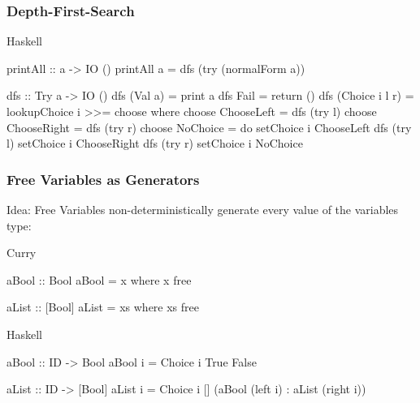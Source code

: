 \documentclass[utf8]{beamer}
\newenvironment{program}{\begin{semiverbatim}\small}{\end{semiverbatim}}
\begin{document}
\begin{frame}[fragile]
\frametitle{Depth-First-Search}

\begin{block}{Haskell}
\begin{program}
printAll :: a -> IO ()
printAll a = dfs (try (normalForm a))

dfs :: Try a -> IO ()
dfs (Val a)        = print a
dfs Fail           = return ()
dfs (Choice i l r) = lookupChoice i >>= choose
 where choose ChooseLeft  = dfs (try l)
       choose ChooseRight = dfs (try r)
       choose NoChoice    = do setChoice i ChooseLeft
                               dfs (try l)
                               setChoice i ChooseRight
                               dfs (try r)
                               setChoice i NoChoice
\end{program}
\end{block}


\end{frame}

\begin{frame}[fragile]
\frametitle{Free Variables as Generators}

Idea: Free Variables non-deterministically generate every value
of the variables type:

\begin{block}{Curry}
\begin{program}
aBool :: Bool
aBool = x where x free

aList :: [Bool]
aList = xs where xs free 
\end{program}
\end{block}

\begin{block}{Haskell}
\begin{program}
aBool :: ID -> Bool
aBool i = Choice i True False

aList :: ID -> [Bool]
aList i = Choice i [] (aBool (left i) : aList (right i))
\end{program}
\end{block}
\end{frame}
\end{document}
